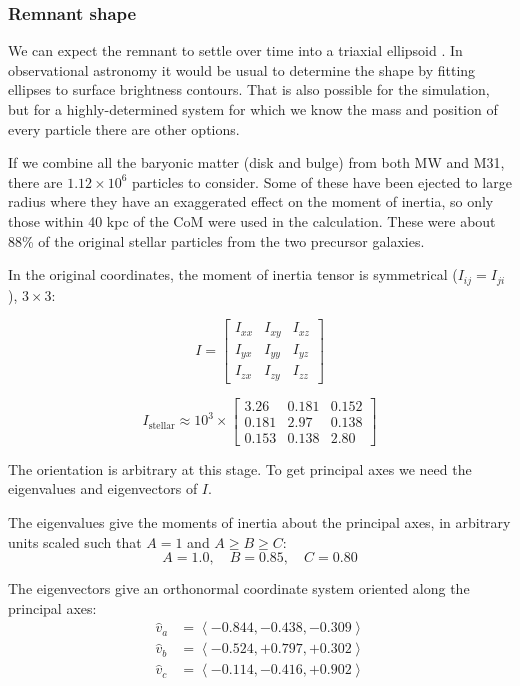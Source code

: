 \documentclass[twocolumn]{aastex63}
\newcommand{\todo}{\color{red}{TODO}\color{black}\hspace{2mm}}
\begin{document}
\subsubsection{Remnant shape}

We can expect the remnant to settle over time into a triaxial ellipsoid \todo{ref?}. In observational astronomy it would be usual to determine the shape by fitting ellipses to surface brightness contours. That is also possible for the simulation, but for a highly-determined system for which we know the mass and position of every particle there are other options.

If we combine all the baryonic matter (disk and bulge) from both MW and M31, there are $1.12 \times 10^6$ particles to consider. Some of these have been ejected to large radius where they have an exaggerated effect on the moment of inertia, so only those within 40 kpc of the CoM were used in the calculation. These were about 88\% of the original stellar particles from the two precursor galaxies.

In the original coordinates, the moment of inertia tensor is symmetrical ($I_{ij} = I_{ji}$), $3 \times 3$:

\[ I = \begin{bmatrix}
			I_{xx} & I_{xy} & I_{xz}\\
			I_{yx} & I_{yy} & I_{yz}\\
			I_{zx} & I_{zy} & I_{zz} 
		\end{bmatrix} \]
		
\[  I_{\text{stellar}} \approx 10^3 \times \begin{bmatrix}
		3.26 & 0.181 & 0.152\\
		0.181 & 2.97 & 0.138\\
		0.153 & 0.138 & 2.80
	\end{bmatrix} \] %
		
The orientation is arbitrary at this stage. To get principal axes we need the eigenvalues and eigenvectors of $I$. 

The eigenvalues give the moments of inertia about the principal axes, in arbitrary units scaled such that $A=1$ and $A \ge B \ge C$:
\[ A=1.0,\quad B= 0.85,\quad C=0.80 \]

The eigenvectors give an orthonormal coordinate system oriented along the principal axes:
\begin{align*}
	\hat{v}_a &= \left< -0.844, -0.438, -0.309 \right> \\
	\hat{v}_b &= \left< -0.524, +0.797,  +0.302 \right> \\
	\hat{v}_c &= \left< -0.114, -0.416 , +0.902 \right>
\end{align*}
\end{document}
